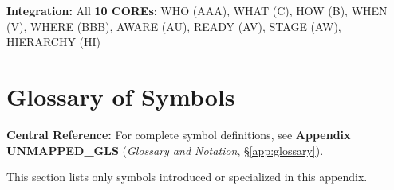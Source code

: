\begin{tcolorbox}[colback=green!10!white, colframe=green!75!black,
    title=\textbf{Appendix TKT: Summary (v2.0 --- Emergent Intervention Theory)}]
\textbf{Integration:} All \textbf{10 COREs}: WHO (AAA), WHAT (C), HOW (B), WHEN (V), WHERE (BBB), AWARE (AU), READY (AV), STAGE (AW), HIERARCHY (HI)

\end{tcolorbox}


\section{Glossary of Symbols}
\label{sec:hhh-glossary}

\begin{tcolorbox}[colback=blue!5!white, colframe=blue!75!black]
\textbf{Central Reference:} For complete symbol definitions, see
\textbf{Appendix UNMAPPED_GLS} (\textit{Glossary and Notation}, \S\ref{app:glossary}).

This section lists only symbols introduced or specialized in this appendix.
\end{tcolorbox}

\vspace{0.5em}

